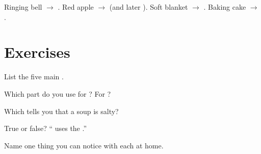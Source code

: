 \begin{example}\label{ex:g1:senses:guess}
Ringing bell $\to$ . Red apple $\to$  (and later ).
Soft blanket $\to$ . Baking cake $\to$ .
\end{example}

\section{Exercises}

\begin{exercise}[$\star$]\label{exo:g1:senses:1}
List the five main .
\end{exercise}

\begin{exercise}[$\star$]\label{exo:g1:senses:2}
Which  part do you use for ? For ?
\end{exercise}

\begin{exercise}[$\star$]\label{exo:g1:senses:3}
Which  tells you that a soup is salty?
\end{exercise}

\begin{exercise}[$\star$]\label{exo:g1:senses:4}
True or false? `` uses the .''
\end{exercise}

\begin{exercise}[$\star\star$]\label{exo:g1:senses:5}
Name one thing you can notice with each  at home.
\end{exercise}

